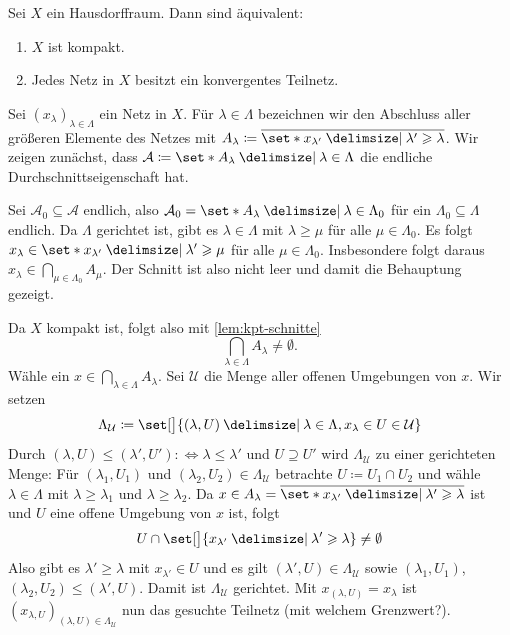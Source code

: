 \begin{satz}[{name=[Charakterisierung von Kompaktheit durch konvergente Teilnetze]}]
Sei $X$ ein Hausdorffraum. Dann sind äquivalent:
\begin{enumerate}[1)]
	\item $X$ ist kompakt.
	\item Jedes Netz in $X$ besitzt ein konvergentes Teilnetz.
\end{enumerate}
\end{satz}
\begin{beweis}
	Sei $(x_\lambda )_{\lambda  \in \Lambda}$ ein Netz in $X$. 
	Für $\lambda \in \Lambda$ bezeichnen wir den Abschluss aller größeren Elemente des Netzes mit
	$A_\lambda \coloneqq \overline{\set*{x_{\lambda'} \given \lambda' \ge \lambda}}$. 
	Wir zeigen zunächst, dass $\mathcal{A} \coloneqq \set*{A_\lambda  \given \lambda  \in \Lambda}$ die endliche Durchschnittseigenschaft hat. 
	
	Sei $\mathcal{A}_0 \subseteq \mathcal{A}$ endlich, also $\mathcal{A}_0 = \set*{A_\lambda \given \lambda \in \Lambda_0}$ für ein $\Lambda_0 \subseteq \Lambda$ endlich. 
	Da $\Lambda$ gerichtet ist, gibt es $\lambda \in \Lambda$ mit $\lambda \ge \mu$ für alle $\mu \in \Lambda_0$. 
	Es folgt $x_\lambda \in \set*{x_{\lambda'} \given \lambda ' \ge \mu}$ für alle $\mu \in \Lambda_0$. 
	Insbesondere folgt daraus 
	\(
		x_\lambda \in \bigcap_{\mu \in \Lambda_0} \! A_\mu
	\).
	Der Schnitt ist also nicht leer und damit die Behauptung gezeigt.
	
	Da $X$ kompakt ist, folgt also mit \cref{lem:kpt-schnitte}
	\[
		\bigcap_{\lambda  \in \Lambda} A_\lambda \neq \emptyset.
	\]
	Wähle ein $x \in \bigcap_{\lambda  \in \Lambda} A_\lambda$. 
	Sei $\mathcal{U}$ die Menge aller offenen Umgebungen von $x$. Wir setzen 
	\[
		\Lambda_\mathcal{U} \coloneqq \set[\big]{(\lambda , U) \given \lambda \in \Lambda, x_\lambda \in U \in \mathcal{U}}
	\]
	Durch $(\lambda , U) \le (\lambda', U') :\Leftrightarrow \lambda \le \lambda'$ und $U \supseteq U'$ wird $\Lambda_\mathcal{U}$ zu einer gerichteten Menge: 
	Für $(\lambda_1, U_1)$ und $(\lambda _2, U_2) \in \Lambda_\mathcal{U}$ betrachte $U \coloneqq U_1 \cap U_2$ und wähle $\lambda \in \Lambda$ mit $\lambda \ge \lambda_1$ und $\lambda  \ge \lambda_2$. 
	Da $x \in A_\lambda = \overline{\set*{x_{\lambda'} \given \lambda' \ge \lambda}}$ ist und $U$ eine offene Umgebung von $x$ ist, folgt 
	\[
		U \cap \set[\big]{x_{\lambda'} \given \lambda'  \ge \lambda } \neq \emptyset
	\]
	Also gibt es $\lambda' \ge \lambda $ mit $x_{\lambda'} \in U$ und es gilt $(\lambda', U) \in \Lambda_\mathcal{U}$ sowie $(\lambda_1, U_1)$, $(\lambda_2, U_2) \le (\lambda', U)$.
	Damit ist $\Lambda_{\mathcal{U}}$ gerichtet.
	Mit $x_{(\lambda , U)} = x_\lambda $ ist $(x_{\lambda , U})_{(\lambda ,U) \in \Lambda_\mathcal{U}}$ nun das gesuchte Teilnetz (mit welchem Grenzwert?).
	

\end{beweis}
